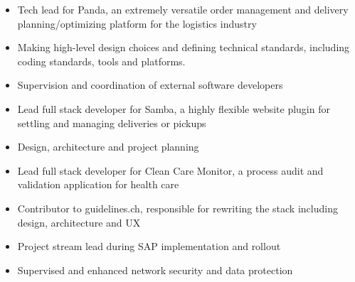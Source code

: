 \documentclass[9pt,a4paper]{altacv}
\begin{document}

\begin{fullwidth}
\makecvheader
\end{fullwidth}



\begin{itemize}
\item Tech lead for Panda, an extremely versatile order management and delivery planning/optimizing platform for the logistics industry
\item Making high-level design choices and defining technical standards, including coding standards, tools and platforms.
\item Supervision and coordination of external software developers
\item Lead full stack developer for Samba, a highly flexible website plugin for settling and managing deliveries or pickups
\end{itemize}

\divider

\begin{itemize}
\item Design, architecture and project planning
\item Lead full stack developer for Clean Care Monitor, a process audit and validation application for health care
\item Contributor to guidelines.ch, responsible for rewriting the stack including design, architecture and UX
\end{itemize}

\divider

\begin{itemize}
\item Project stream lead during SAP implementation and rollout
\item Supervised and enhanced network security and data protection
\end{itemize}
\end{document}
